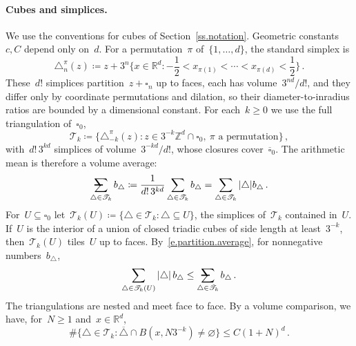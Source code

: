 \documentclass[11pt,letterpaper]{article}
\makeatletter
\numberwithin{equation}{section}
\theoremstyle{definition}
\newcommand{\Rd}{\mathbb{R}^d}
\newcommand{\Zd}{\mathbb{Z}^d}
\newcommand{\cu}{\square}
\renewcommand{\subset}{\subseteq}
\newcommand{\avsum}{\mathop{\mathpalette\avsuminner\relax}\displaylimits}
\newcommand\avsuminner[2]{%
	{\sbox0{$\m@th#1\sum$}%
		\vphantom{\usebox0}%
		\ooalign{%
			\hidewidth
			\smash{\,\rule[.23em]{8.8pt}{1.1pt} \relax}%
			\hidewidth\cr
			$\m@th#1\sum$\cr
		}%
	}%
}
\makeatother
\begin{document}
\paragraph{Cubes and simplices.} We use the conventions for cubes of Section~\ref{ss.notation}. Geometric constants~$c,C$ depend only on~$d$. For a permutation~$\pi$ of~$\{1,\ldots,d\}$, the standard simplex is
\begin{equation}
	\triangle_n^\pi(z)\coloneqq z+3^n\bigl\{x\in\Rd:-\frac12<x_{\pi(1)}<\cdots<x_{\pi(d)}<\frac12\bigr\}\,.
	\label{e.simplex.def}
\end{equation}
These~$d!$ simplices partition~$z+\cu_n$ up to faces, each has volume~$3^{nd}/d!$, and they differ only by coordinate permutations and dilation, so their diameter-to-inradius ratios are bounded by a dimensional constant. For each~$k\geq0$ we use the full triangulation of~$\cu_0$,
\begin{equation}
	\mathscr T_k\coloneqq\bigl\{\triangle_{-k}^{\pi}(z):z\in 3^{-k}\Zd\cap\cu_0,\ \pi\text{ a permutation}\bigr\}\,,
	\label{e.simplex.family}
\end{equation}
with~$d!\,3^{kd}$ simplices of volume~$3^{-kd}/d!$, whose closures cover~$\overline{\cu}_0$. The arithmetic mean is therefore a volume average:
\begin{equation}
	\avsum_{\triangle\in\mathscr T_k}b_\triangle\coloneqq\frac{1}{d!\,3^{kd}}\sum_{\triangle\in\mathscr T_k}b_\triangle=\sum_{\triangle\in\mathscr T_k}|\triangle|b_\triangle\,.
	\label{e.partition.average}
\end{equation}
For~$U\subseteq\cu_0$ let~$\mathscr T_k(U)\coloneqq\{\triangle\in\mathscr T_k:\triangle\subset U\}$, the simplices of~$\mathscr T_k$ contained in~$U$. If~$U$ is the interior of a union of closed triadic cubes of side length at least~$3^{-k}$, then~$\mathscr T_k(U)$ tiles~$U$ up to faces. By~\eqref{e.partition.average}, for nonnegative numbers~$b_\triangle$,
\begin{equation}
	\sum_{\triangle\in\mathscr T_k(U)}|\triangle|\,b_\triangle\leq\avsum_{\triangle\in\mathscr T_k}b_\triangle\,.
	\label{e.partition.restricted}
\end{equation}
The triangulations are nested and meet face to face. By a volume comparison, we have, for~$N\geq1$ and~$x\in\Rd$,
\begin{equation}
	\#\bigl\{\triangle\in\mathscr T_k:\overline\triangle\cap B(x,N3^{-k})\neq\varnothing\bigr\}\leq C(1+N)^d\,.
	\label{e.simplex.count}
\end{equation}
\end{document}
